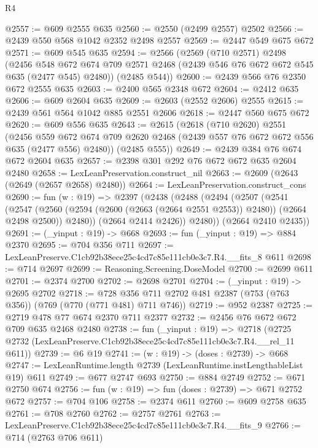 \begin{lexlean}{R4}
\begin{coremodule}
@2557 := @609 @2555 @635
@2560 := @2550 (@2499 @2557) @2502
@2566 := @2439 @550 @568 @1042 @2352 @2498 @2557
@2569 := @2447 @549 @675 @672
@2571 := @609 @545 @635
@2594 := @2566
    (@2569
      (@710 @2571)
      @2498
      (@2456
        @548
        @672
        @674
        @709
        @2571
        @2468
        (@2439 @546 @76 @672 @672 @545 @635 (@2477 @545) @2480))
      (@2485 @544))
@2600 := @2439 @566 @76 @2350 @672 @2555 @635
@2603 := @2400 @565 @2348 @672
@2604 := @2412 @635
@2606 := @609 @2604 @635
@2609 := @2603 (@2552 @2606) @2555
@2615 := @2439 @561 @564 @1042 @885 @2551 @2606
@2618 := @2447 @560 @675 @672
@2620 := @609 @556 @635
@2643 := @2615
    (@2618
      (@710 @2620)
      @2551
      (@2456
        @559
        @672
        @674
        @709
        @2620
        @2468
        (@2439 @557 @76 @672 @672 @556 @635 (@2477 @556) @2480))
      (@2485 @555))
@2649 := @2439 @384 @76 @674 @672 @2604 @635
@2657 := @2398 @301 @292 @76 @672 @672 @635 @2604 @2480
@2658 := LexLeanPreservation.construct_nil
@2663 := @2609 (@2643 (@2649 (@2657 @2658) @2480))
@2664 := LexLeanPreservation.construct_cons
@2690 := fun (w : @19) =>
  @2397
    (@2438
      (@2488
        (@2494
          (@2507
            (@2541
              (@2547
                (@2560 (@2594 (@2600 (@2663 (@2664 @2551 @2553)) @2480)) (@2664 @2498 @2500))
                @2480))
            (@2664 @2414 @2426))
          @2480))
      (@2664 @2410 @2435))
@2691 := (_yinput : @19) -> @668
@2693 := fun (_yinput : @19) => @884 @2370
@2695 := @704 @356 @711
@2697 := LexLeanPreserve.C1cb92b38ece25c4cd7c85e111cb0e3c7.R4.__fits_8 @611
@2698 := @714 @2697
@2699 := Reasoning.Screening.DoseModel
@2700 := @2699 @611
@2701 := @2374 @2700
@2702 := @2698 @2701
@2704 := (_yinput : @19) -> @2695 @2702
@2718 := @728 @356 @711 @2702 @481 @2387 (@753 (@763 @356)) (@769 (@770 (@771 @481) @711 @746))
@2719 := @952 @2387
@2725 := @2719 @478 @77 @674 @2370 @711 @2377
@2732 := @2456 @76 @672 @672 @709 @635 @2468 @2480
@2738 := fun (_yinput : @19) =>
  @2718 (@2725 @2732 (LexLeanPreserve.C1cb92b38ece25c4cd7c85e111cb0e3c7.R4.__rel_11 @611))
@2739 := @6 @19
@2741 := (w : @19) -> (doses : @2739) -> @668
@2747 := LexLeanRuntime.length @2739 (LexLeanRuntime.instLengthableList @19) @611
@2749 := @677 @2747 @693
@2750 := @884 @2749
@2752 := @671 @2750 @674
@2756 := fun (w : @19) => fun (doses : @2739) => @671 @2752 @672
@2757 := @704 @106
@2758 := @2374 @611
@2760 := @609 @2758 @635
@2761 := @708 @2760
@2762 := @2757 @2761
@2763 := LexLeanPreserve.C1cb92b38ece25c4cd7c85e111cb0e3c7.R4.__fits_9
@2766 := @714 (@2763 @706 @611)

\end{coremodule}
\end{lexlean}
